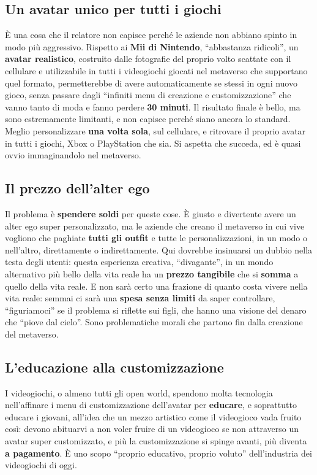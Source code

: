 \subsection{Un avatar unico per tutti i giochi}

È una cosa che il relatore non capisce perché le aziende non abbiano spinto in
modo più aggressivo. Rispetto ai \textbf{Mii di Nintendo}, ``abbastanza
ridicoli'', un \textbf{avatar realistico}, costruito dalle fotografie del proprio
volto scattate con il cellulare e utilizzabile in tutti i videogiochi giocati
nel metaverso che supportano quel formato, permetterebbe di avere
automaticamente se stessi in ogni nuovo gioco, senza passare dagli ``infiniti
menu di creazione e customizzazione'' che vanno tanto di moda e fanno perdere
\textbf{30 minuti}. Il risultato finale è bello, ma sono estremamente limitanti,
e non capisce perché siano ancora lo standard. Meglio personalizzare
\textbf{una volta sola}, sul cellulare, e ritrovare il proprio avatar in tutti i
giochi, Xbox o PlayStation che sia. Si aspetta che succeda, ed è quasi ovvio
immaginandolo nel metaverso.

\subsection{Il prezzo dell'alter ego}

Il problema è \textbf{spendere soldi} per queste cose. È giusto e divertente
avere un alter ego super personalizzato, ma le aziende che creano il metaverso in
cui vive vogliono che paghiate \textbf{tutti gli outfit} e tutte le
personalizzazioni, in un modo o nell'altro, direttamente o indirettamente. Qui
dovrebbe insinuarsi un dubbio nella testa degli utenti: questa esperienza
creativa, ``divagante'', in un mondo alternativo più bello della vita reale ha
un \textbf{prezzo tangibile} che si \textbf{somma} a quello della vita reale. E
non sarà certo una frazione di quanto costa vivere nella vita reale: semmai ci
sarà una \textbf{spesa senza limiti} da saper controllare, ``figuriamoci'' se il
problema si riflette sui figli, che hanno una visione del denaro che ``piove dal
cielo''. Sono problematiche morali che partono fin dalla creazione del
metaverso.

\subsection{L'educazione alla customizzazione}

I videogiochi, o almeno tutti gli open world, spendono molta tecnologia
nell'affinare i menu di customizzazione dell'avatar per \textbf{educare}, e
soprattutto educare i giovani, all'idea che un mezzo artistico come il
videogioco vada fruito così: devono abituarvi a non voler fruire di un
videogioco se non attraverso un avatar super customizzato, e più la
customizzazione si spinge avanti, più diventa \textbf{a pagamento}. È uno scopo
``proprio educativo, proprio voluto'' dell'industria dei videogiochi di oggi.

